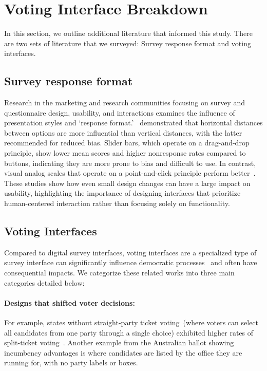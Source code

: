 \section{Voting Interface Breakdown}\label{apdx:relatedVoting}
In this section, we outline additional literature that informed this study. There are two sets of literature that we surveyed: Survey response format and voting interfaces.

\subsection{Survey response format}
Research in the marketing and research communities focusing on survey and questionnaire design, usability, and interactions examines the influence of presentation styles and `response format.'~\citet{weijtersExtremityHorizontalVertical2021} demonstrated that horizontal distances between options are more influential than vertical distances, with the latter recommended for reduced bias. Slider bars, which operate on a drag-and-drop principle, show lower mean scores and higher nonresponse rates compared to buttons, indicating they are more prone to bias and difficult to use. In contrast, visual analog scales that operate on a point-and-click principle perform better~\cite{toepoelSlidersVisualAnalogue2018}. These studies show how even small design changes can have a large impact on usability, highlighting the importance of designing interfaces that prioritize human-centered interaction rather than focusing solely on functionality.

\subsection{Voting Interfaces}
Compared to digital survey interfaces, voting interfaces are a specialized type of survey interface can significantly influence democratic processes~\cite{engstrom2020politics, chisnellDemocracyDesignProblem2016, civicdesignDesigningUsableBallots2015} and often have consequential impacts. We categorize these related works into three main categories detailed below:

\paragraph{Designs that shifted voter decisions: } For example, states without straight-party ticket voting~(where voters can select all candidates from one party through a single choice) exhibited higher rates of split-ticket voting~\cite{engstrom2020politics}. Another example from the Australian ballot showing incumbency advantages is where candidates are listed by the office they are running for, with no party labels or boxes.

